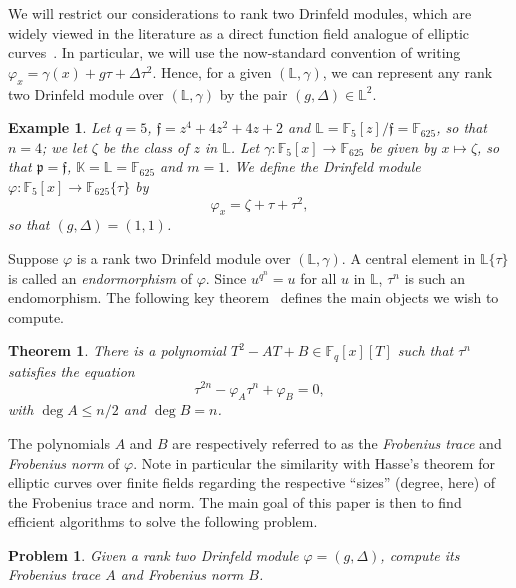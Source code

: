 \documentclass[sigconf]{acmart}
\newtheorem{theorem}{Theorem}
\newtheorem{example}{Example}
\newtheorem{problem}{Problem}
\newcommand{\A}{\mathbb{A}}
\newcommand{\Q}{\mathbb{Q}}
\renewcommand{\P}{\mathbb{P}}
\newcommand{\K}{\mathbb{K}}
\newcommand{\F}{\mathbb{F}}
\renewcommand{\L}{\mathbb{L}}
\newcommand{\ang}[1]{\{#1\}}
\newcommand{\frakf}{\mathfrak{f}}
\newcommand{\frakp}{\mathfrak{p}}
\begin{document}
We will restrict our considerations to rank two Drinfeld modules,
which are widely viewed in the literature as a direct function field
analogue of elliptic curves~\cite{GEKELE1991187}. In particular, we
will use the now-standard convention of writing $\varphi_x = \gamma(x)
+ g \tau + \Delta \tau^2$. Hence, for a given $(\L,\gamma)$, we can
represent any rank two Drinfeld module over $(\L,\gamma)$ by the pair
$(g,\Delta) \in\L^2$.

\begin{example}
  Let $q = 5$, $\frakf = z^4 +4z^2+ 4z + 2$ and $\L = \F_5[z]/\frakf =
  \mathbb{F}_{625}$, so that $n=4$; we let $\zeta$ be the class of $z$ in
  $\L$.
  Let $\gamma: \F_5[x] \to \F_{625}$ be given by $x \mapsto \zeta$, so
  that $\frakp=\frakf$, $\K=\L=\F_{625}$ and $m=1$. We define the Drinfeld
  module $\varphi: \F_5[x] \to \F_{625}\ang{\tau}$ by
\[ \varphi_x = \zeta + \tau + \tau^2,\]
so that $(g,\Delta)=(1,1)$.
\end{example}


Suppose $\varphi$ is a rank two Drinfeld module over $(\L,\gamma)$. A
central element in $\L\ang{\tau}$ is called an {\em endormorphism} of
$\varphi$. Since $u^{q^n} = u$ for all $u$ in $\L$, $\tau^n$ is such
an endomorphism. The following key theorem~\cite{GEKELE1991187}
defines the main objects we wish to compute.
\begin{theorem}\label{charpoly}
  There is a polynomial $T^2 -AT + B \in \F_q[x][T]$ such that
  $\tau^n$ satisfies the  equation
  \begin{equation} \tau^{2n} - \varphi_A \tau^n + \varphi_B = 0,\end{equation}
  with $\deg A \le n/2$ and $\deg B=n$.
\end{theorem}
The polynomials $A$ and $B$ are respectively referred to as the
\textit{Frobenius trace} and \textit{Frobenius norm} of $\varphi$.
Note in particular the similarity with Hasse's theorem for elliptic
curves over finite fields regarding the respective ``sizes'' (degree,
here) of the Frobenius trace and norm.  The main goal of this paper is
then to find efficient algorithms to solve the following problem.
\begin{problem}\label{pb1}
  Given a rank two Drinfeld module $\varphi = (g,\Delta)$, compute its
  Frobenius trace $A$ and Frobenius norm $B$.
\end{problem}
\end{document}
